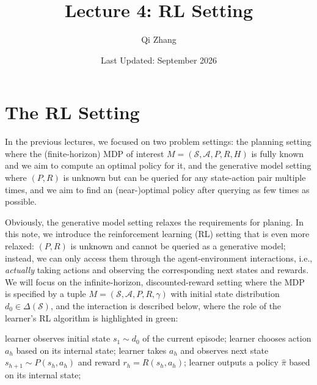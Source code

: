 \title{Lecture 4: RL Setting}
\author{Qi Zhang}
\date{Last Updated: September 2026}

\section{The RL Setting}
In the previous lectures, we focused on two problem settings:
the planning setting where the (finite-horizon) MDP of interest $M=(\mathcal{S},\mathcal{A}, P, R, H)$ is fully known and we aim to compute an optimal policy for it,
and the generative model setting where $(P,R)$ is unknown but can be queried for any state-action pair multiple times, and we aim to find an (near-)optimal policy after querying as few times as possible.

Obviously, the generative model setting relaxes the requirements for planing. 
In this note, we introduce the reinforcement learning (RL) setting that is even more relaxed:
$(P,R)$ is unknown and cannot be queried as a generative model; instead, we can only access them through the agent-environment interactions, i.e., {\em actually} taking actions and observing the corresponding next states and rewards.
We will focus on the infinite-horizon, discounted-reward setting where the MDP is specified by a tuple $M=(\mathcal{S},\mathcal{A},P,R,\gamma)$ with initial state distribution $d_0\in\Delta(\mathcal{S})$, and the interaction is described below, where the role of the learner's RL algorithm is highlighted in {\color{OliveGreen} green}:
\begin{protocol}
\caption{RL interaction (infinite-horizon)} \label{protocol:RL interaction}
\begin{algorithmic}[1]
    \State learner observes initial state $s_1\sim d_0$ of the current episode; 
     
        \State learner chooses action $a_h$ {\color{OliveGreen} based on its internal state};
        \label{protocol:RL interaction:line:choose action}
        \State learner takes $a_h$ and  observes next state $s_{h+1}\sim P(s_h,a_h)$ and reward $r_h=R(s_h,a_h)$;
        \label{protocol:RL interaction:line:update internal state}
    \EndFor
{}
\State learner outputs a policy $\widehat{\pi}$ {\color{OliveGreen} based on its internal state};
\label{protocol:RL interaction:line:final policy}
\end{algorithmic}
\end{protocol}

